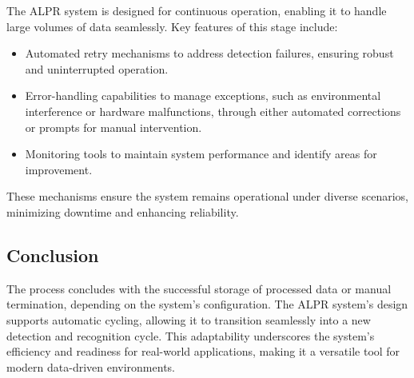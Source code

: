 The ALPR system is designed for continuous operation, enabling it to handle large volumes of data seamlessly. Key features of this stage include:
\begin{itemize}
	\item Automated retry mechanisms to address detection failures, ensuring robust and uninterrupted operation.
	\item Error-handling capabilities to manage exceptions, such as environmental interference or hardware malfunctions, through either automated corrections or prompts for manual intervention.
	\item Monitoring tools to maintain system performance and identify areas for improvement.
\end{itemize}
These mechanisms ensure the system remains operational under diverse scenarios, minimizing downtime and enhancing reliability.

\subsection{Conclusion}

The process concludes with the successful storage of processed data or manual termination, depending on the system's configuration. The ALPR system's design supports automatic cycling, allowing it to transition seamlessly into a new detection and recognition cycle. This adaptability underscores the system’s efficiency and readiness for real-world applications, making it a versatile tool for modern data-driven environments.
